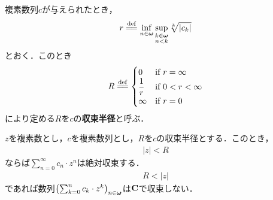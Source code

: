 	\begin{screen}
		\begin{dfn}[収束半径]
			複素数列$c$が与えられたとき，
			\begin{align}
				r \defeq \inf{n \in \Natural}{\sup{\substack{k \in \Natural \\ n < k}}{\sqrt[k]{|c_{k}|}}}
			\end{align}
			とおく．このとき
			\begin{align}
				R \defeq
				\begin{cases}
					0 & \mbox{if } r = \infty \\
					\displaystyle{\frac{1}{r}} & \mbox{if } \displaystyle{0 < r < \infty} \\
					\infty & \mbox{if } r = 0
				\end{cases}
			\end{align}
			により定める$R$を$c$の{\bf 収束半径}と呼ぶ．
		\end{dfn}
	\end{screen}
	
	\begin{screen}
		\begin{thm}
		\label{thm:absolutely_converge_inside_the_convergence_circle}
			$z$を複素数とし，$c$を複素数列とし，$R$を$c$の収束半径とする．このとき，
			\begin{align}
				|z| < R
			\end{align}
			ならば$\sum_{n=0}^{\infty} c_n \cdot z^n$は絶対収束する．
			\begin{align}
				R < |z|
			\end{align}
			であれば数列$\left(\sum_{k=0}^{n} c_{k} \cdot z^{k}\right)_{n \in {\boldsymbol \omega}}$は$\mathbf{C}$で収束しない．
		\end{thm}
	\end{screen}
	
